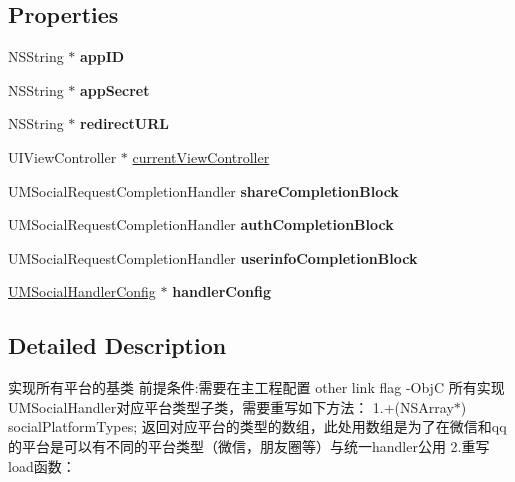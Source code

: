 \subsection*{Properties}
\begin{DoxyCompactItemize}
\item 
\mbox{\label{interface_u_m_social_handler_a6d3f03e458b7f36a412a70686b31d59a}} 
N\+S\+String $\ast$ {\bfseries app\+ID}
\item 
\mbox{\label{interface_u_m_social_handler_aac117296c37bbb62406ba6e0231f3cc2}} 
N\+S\+String $\ast$ {\bfseries app\+Secret}
\item 
\mbox{\label{interface_u_m_social_handler_ac3238b4ccd0b1963afa347c4b118cf24}} 
N\+S\+String $\ast$ {\bfseries redirect\+U\+RL}
\item 
U\+I\+View\+Controller $\ast$ \mbox{\hyperlink{interface_u_m_social_handler_a797b20d6bbafd076123413b08c0faa14}{current\+View\+Controller}}
\item 
\mbox{\label{interface_u_m_social_handler_ae241d52148b95ee2a5d502996e0d4ca5}} 
U\+M\+Social\+Request\+Completion\+Handler {\bfseries share\+Completion\+Block}
\item 
\mbox{\label{interface_u_m_social_handler_a717c75543f50bd0c53964a4cb7b60fde}} 
U\+M\+Social\+Request\+Completion\+Handler {\bfseries auth\+Completion\+Block}
\item 
\mbox{\label{interface_u_m_social_handler_a989c38ffedc2667e8c90c78f85806f3f}} 
U\+M\+Social\+Request\+Completion\+Handler {\bfseries userinfo\+Completion\+Block}
\item 
\mbox{\label{interface_u_m_social_handler_a1eb4a2d21d2d751d135813a2397c7094}} 
\mbox{\hyperlink{interface_u_m_social_handler_config}{U\+M\+Social\+Handler\+Config}} $\ast$ {\bfseries handler\+Config}
\end{DoxyCompactItemize}


\subsection{Detailed Description}
实现所有平台的基类  前提条件\+:需要在主工程配置 other link flag -\/\+ObjC 所有实现\+U\+M\+Social\+Handler对应平台类型子类，需要重写如下方法： 1.+(N\+S\+Array$\ast$) social\+Platform\+Types; 返回对应平台的类型的数组，此处用数组是为了在微信和qq的平台是可以有不同的平台类型（微信，朋友圈等）与统一handler公用 2.重写load函数：

